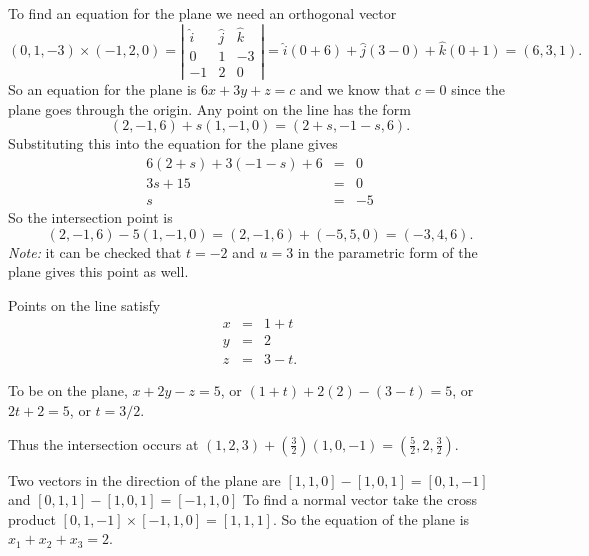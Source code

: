 \vspace{2mm}
To find an equation for the plane we need an orthogonal vector 
\[
(0,1,-3) \times (-1,2,0)  =  \left| \begin{array}{ccc}
\hat{i} & \hat{j} & \hat{k} \\
0 & 1 & -3 \\
-1 & 2 & 0
\end{array} \right| = \hat{i} (0+6) + \hat{j} (3-0) + \hat{k}(0+1)
   = (6,3,1).
\]
So an equation for the plane is $6x + 3y + z = c$ and we know that 
$c=0$ since the plane goes through the origin. Any point on the line has the 
form 
\[
(2,-1,6) + s(1,-1,0) = (2+s, -1-s,6).
\]
Substituting this into the equation for the plane gives
\begin{eqnarray*}
6 (2+s) + 3(-1-s) + 6 & = & 0 \\
3s + 15 & = & 0 \\
s & = & -5 
\end{eqnarray*}
So the intersection point is 
\[
(2,-1,6) - 5(1,-1,0) = (2,-1,6)+(-5,5,0) = (-3,4,6). 
\]
{\em Note:} it can be checked that $t=-2$ and $u=3$ in the parametric form 
of the plane gives this point as well.

\vspace{2mm}
Points on the line satisfy
\begin{eqnarray*}
x &=& 1+t\\
y &=& 2\\
z &=& 3-t.
\end{eqnarray*}

To be on the plane, $x+2y-z=5$, or $(1+t) + 2(2) - (3-t) = 5$, or $2t+2=5$, or $t=3/2$.

Thus the intersection occurs at $(1,2,3) + (\frac{3}{2})(1,0,-1) = (\frac{5}{2},2,\frac{3}{2})$.

\vspace{2mm}
Two vectors in the direction of the plane are $[1,1,0]-[1,0,1]=[0,1,-1]$ and
$[0,1,1]-[1,0,1]=[-1,1,0]$ To find a normal vector take the cross product
$[0,1,-1]\times[-1,1,0]=[1,1,1]$. So the equation of the plane is
$x_1+x_2+x_3=2$.

